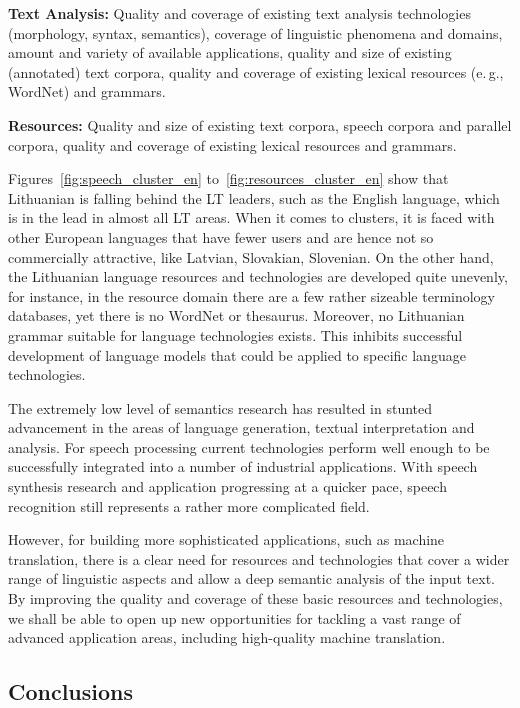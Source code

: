 \begin{multicols}{2}
\textbf{Text Analysis:} Quality and coverage of existing text analysis technologies (morphology, syntax, semantics), coverage of linguistic phenomena and domains, amount and variety of available applications, quality and size of existing (annotated) text corpora, quality and coverage of existing lexical resources (e.\,g., WordNet) and grammars.

\textbf{Resources:} Quality and size of existing text corpora, speech corpora and parallel corpora, quality and coverage of existing lexical resources and grammars.

Figures~\ref{fig:speech_cluster_en} to~\ref{fig:resources_cluster_en} show that Lithuanian is falling behind the LT leaders, such as the English language, which is in the lead in almost all LT areas. When it comes to clusters, it is faced with other European languages that have fewer users and are hence not so commercially attractive, like Latvian, Slovakian, Slovenian. On the other hand, the Lithuanian language resources and technologies are developed quite unevenly, for instance, in the resource domain there are a few rather sizeable terminology databases, yet there is no WordNet or thesaurus. Moreover, no Lithuanian grammar suitable for language technologies exists. This inhibits successful development of language models that could be applied to specific language technologies.

    The extremely low level of semantics research has resulted in stunted advancement in the areas of language generation, textual interpretation and analysis. For speech processing current technologies perform well enough to be successfully integrated into a number of industrial applications. With speech synthesis research and application progressing at a quicker pace, speech recognition still represents a rather more complicated field.

    However, for building more sophisticated applications, such as machine translation, there is a clear need for resources and technologies that cover a wider range of linguistic aspects and allow a deep semantic analysis of the input text. By improving the quality and coverage of these basic resources and technologies, we shall be able to open up new opportunities for tackling a vast range of advanced application areas, including high-quality machine translation.

\subsection{Conclusions}


\end{multicols}
